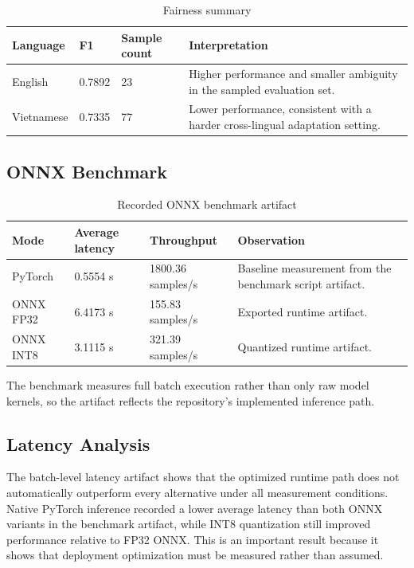 \documentclass[12pt, a4paper]{article}
\begin{document}
\begin{table}[H]
\centering
\caption{Fairness summary}
\begin{tabularx}{\textwidth}{@{} p{2.5cm} p{2.5cm} p{2.5cm} X @{}}
\toprule
\textbf{Language} & \textbf{F1} & \textbf{Sample count} & \textbf{Interpretation} \\
\midrule
English & 0.7892 & 23 & Higher performance and smaller ambiguity in the sampled evaluation set. \\
Vietnamese & 0.7335 & 77 & Lower performance, consistent with a harder cross-lingual adaptation setting. \\
\bottomrule
\end{tabularx}
\end{table}

\subsection{ONNX Benchmark}
\begin{table}[H]
\centering
\caption{Recorded ONNX benchmark artifact}
\begin{tabularx}{\textwidth}{@{} p{2.6cm} p{2.5cm} p{2.7cm} X @{}}
\toprule
\textbf{Mode} & \textbf{Average latency} & \textbf{Throughput} & \textbf{Observation} \\
\midrule
PyTorch & 0.5554 s & 1800.36 samples/s & Baseline measurement from the benchmark script artifact. \\
ONNX FP32 & 6.4173 s & 155.83 samples/s & Exported runtime artifact. \\
ONNX INT8 & 3.1115 s & 321.39 samples/s & Quantized runtime artifact. \\
\bottomrule
\end{tabularx}
\end{table}
The benchmark measures full batch execution rather than only raw model kernels, so the artifact reflects the repository’s implemented inference path.

\subsection{Latency Analysis}
The batch-level latency artifact shows that the optimized runtime path does not automatically outperform every alternative under all measurement conditions. Native PyTorch inference recorded a lower average latency than both ONNX variants in the benchmark artifact, while INT8 quantization still improved performance relative to FP32 ONNX. This is an important result because it shows that deployment optimization must be measured rather than assumed.
\end{document}
